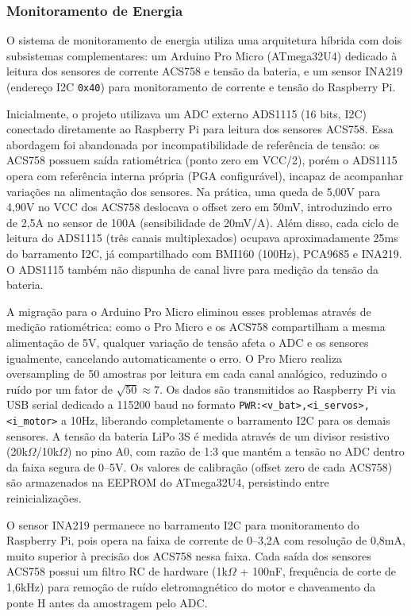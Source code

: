 \subsubsection{Monitoramento de Energia}

O sistema de monitoramento de energia utiliza uma arquitetura híbrida com dois subsistemas complementares: um Arduino Pro Micro (ATmega32U4) dedicado à leitura dos sensores de corrente ACS758 e tensão da bateria, e um sensor INA219 (endereço \gls{I2C} \texttt{0x40}) para monitoramento de corrente e tensão do Raspberry Pi.

Inicialmente, o projeto utilizava um ADC externo ADS1115 (16 bits, \gls{I2C}) conectado diretamente ao Raspberry Pi para leitura dos sensores ACS758. Essa abordagem foi abandonada por incompatibilidade de referência de tensão: os ACS758 possuem saída ratiométrica (ponto zero em VCC/2), porém o ADS1115 opera com referência interna própria (PGA configurável), incapaz de acompanhar variações na alimentação dos sensores. Na prática, uma queda de 5,00V para 4,90V no VCC dos ACS758 deslocava o offset zero em 50mV, introduzindo erro de 2,5A no sensor de 100A (sensibilidade de 20mV/A). Além disso, cada ciclo de leitura do ADS1115 (três canais multiplexados) ocupava aproximadamente 25ms do barramento \gls{I2C}, já compartilhado com BMI160 (100Hz), PCA9685 e INA219. O ADS1115 também não dispunha de canal livre para medição da tensão da bateria.

A migração para o Arduino Pro Micro eliminou esses problemas através de medição ratiométrica: como o Pro Micro e os ACS758 compartilham a mesma alimentação de 5V, qualquer variação de tensão afeta o ADC e os sensores igualmente, cancelando automaticamente o erro. O Pro Micro realiza oversampling de 50 amostras por leitura em cada canal analógico, reduzindo o ruído por um fator de $\sqrt{50} \approx 7$. Os dados são transmitidos ao Raspberry Pi via USB serial dedicado a 115200 baud no formato \texttt{PWR:<v\_bat>,<i\_servos>,<i\_motor>} a 10Hz, liberando completamente o barramento \gls{I2C} para os demais sensores. A tensão da bateria LiPo 3S é medida através de um divisor resistivo (20k$\Omega$/10k$\Omega$) no pino A0, com razão de 1:3 que mantém a tensão no ADC dentro da faixa segura de 0--5V. Os valores de calibração (offset zero de cada ACS758) são armazenados na EEPROM do ATmega32U4, persistindo entre reinicializações.

O sensor INA219 permanece no barramento \gls{I2C} para monitoramento do Raspberry Pi, pois opera na faixa de corrente de 0--3,2A com resolução de 0,8mA, muito superior à precisão dos ACS758 nessa faixa. Cada saída dos sensores ACS758 possui um filtro RC de hardware (1k$\Omega$ + 100nF, frequência de corte de 1,6kHz) para remoção de ruído eletromagnético do motor e chaveamento da ponte H antes da amostragem pelo ADC.


